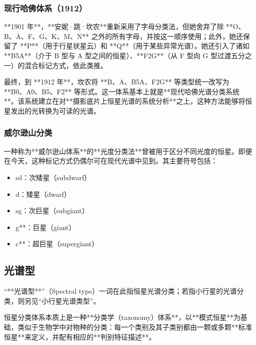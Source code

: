 \subsubsection{现行哈佛体系（1912）}
**1901 年**，**安妮·跳·坎农**重新采用了字母分类法，但她舍弃了除 **O、B、A、F、G、K、M、N** 之外的所有字母，并按这一顺序使用；此外，她还保留了 **P**（用于行星状星云）和 **Q**（用于某些异常光谱）。她还引入了诸如 **B5A**（介于 B 型与 A 型之间的恒星）、**F2G**（从 F 型向 G 型过渡五分之一）的混合标记方式，依此类推。

最终，到 **1912 年**，坎农将 **B、A、B5A、F2G** 等类型统一改写为 **B0、A0、B5、F2** 等形式。这一体系基本上就是**现代哈佛光谱分类系统**。该系统建立在对**摄影底片上恒星光谱的系统分析**之上，这种方法能够将恒星发出的光转换为可读的光谱。
\subsubsection{威尔逊山分类}
一种称为**威尔逊山体系**的**光度分类法**曾被用于区分不同光度的恒星。即便在今天，这种标记方式仍偶尔可在现代光谱中见到。其主要符号包括：

\begin{itemize}
\item sd：次矮星（subdwarf）
\item d：矮星（dwarf）
\item sg：次巨星（subgiant）
\item g**：巨星（giant）
\item c**：超巨星（supergiant）
\end{itemize}

\subsection{光谱型}

“**光谱型**”（Spectral type）一词在此指恒星光谱分类；若指小行星的光谱分类，则另见“小行星光谱类型”。

恒星分类体系本质上是一种**分类学（taxonomy）体系**，以**模式恒星**为基础，类似于生物学中对物种的分类：每一个类别及其子类别都由一颗或多颗**标准恒星**来定义，并配有相应的**判别特征描述**。
